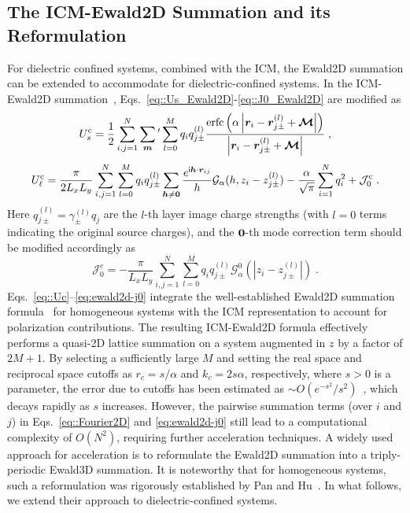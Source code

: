\subsection{The ICM-Ewald2D Summation and its Reformulation}

For dielectric confined systems, combined with the ICM, the Ewald2D summation can be extended to accommodate for dielectric-confined systems.
In the ICM-Ewald2D summation~\cite{gan2024random}, Eqs.~\eqref{eq::Us_Ewald2D}-\eqref{eq::J0_Ewald2D} are modified as
\begin{equation}\label{eq::Uc}
    U_{s}^{\text{c}} =  \frac{1}{2} \sum_{i,j=1}^N \sum_{\bm{m}}{}^\prime \sum_{l=0}^M q_iq_{j \pm}^{(l)} \frac{\text{erfc}\left(\alpha \left|\bm{r}_i - \bm{r}_{j\pm}^{(l)}+ \boldsymbol{\mathcal{M}}\right|\right)}{\left|\bm{r}_i-\bm{r}_{j\pm}^{(l)}+\boldsymbol{\mathcal{M}}\right|}\;,
\end{equation}
\begin{equation}\label{eq::Fourier2D}
    U^{\text{c}}_{\ell} =  \frac{\pi}{2L_xL_y}\sum_{i, j=1}^N \sum_{l = 0}^{M} q_iq_{j \pm}^{(l)} \sum_{\boldsymbol{h}\neq \boldsymbol{0}}\frac{e^{\mathsf i \boldsymbol{h}\cdot \boldsymbol{r}_{ij}}}{h}\mathcal{G}_{\alpha}(h,z_i - z_{j \pm}^{(l)})  - \frac{\alpha}{\sqrt{\pi}}\sum_{i=1}^{N}q_i^2+\mathcal{J}^{\text{c}}_0\;.
\end{equation}
Here $q_{j\pm}^{(l)}=\gamma_{\pm}^{(l)}q_j$ are the $l$-th layer image charge  strengths (with $l = 0$ terms indicating the original source charges), and the $\boldsymbol{0}$-th mode correction term should be modified accordingly as 
\begin{equation}\label{eq:ewald2d-j0}
    \mathcal J_0^c = -\frac{\pi}{L_xL_y}\sum_{i,j=1}^{N}\sum_{l=0}^{M} q_iq_{j\pm}^{(l)}\mathcal{G}_{\alpha}^0(|z_i-z_{j\pm}^{(l)}|)\;.
\end{equation}
Eqs.~\eqref{eq::Uc}--\eqref{eq:ewald2d-j0} integrate the well-established Ewald2D summation formula~\cite{parry1975electrostatic,zhonghanhu2014JCTC} for homogeneous systems with the ICM representation to account for polarization contributions. 
The resulting ICM-Ewald2D formula effectively performs a quasi-2D lattice summation on a system augmented in $z$ by a factor of $2M+1$. 
By selecting a sufficiently large $M$ and setting the real space and reciprocal space cutoffs as $r_c=s/\alpha$ and $k_c=2s\alpha$, respectively, where $s>0$ is a parameter, 
the error due to cutoffs has been estimated as $\sim O(e^{-s^2}/s^2)$~\cite{gan2024fast}, which decays rapidly as $s$ increases. 
However, the pairwise summation terms (over $i$ and $j$) in Eqs.~\eqref{eq::Fourier2D} and \eqref{eq:ewald2d-j0} still lead to a computational complexity of $O(N^2)$, requiring further acceleration techniques.
A widely used approach for acceleration is to reformulate the Ewald2D summation into a triply-periodic Ewald3D summation.
It is noteworthy that for homogeneous systems, such a reformulation was rigorously established by Pan and Hu~\cite{pan2014rigorous}. 
In what follows, we extend their approach to dielectric-confined systems.


